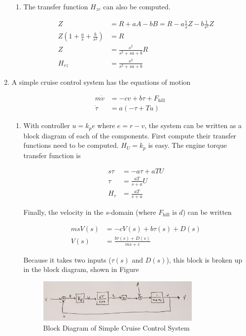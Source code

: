 \documentclass[11pt]{article}
\theoremstyle{definition}
\begin{document}
\begin{enumerate}
\begin{enumerate}
        \item %
        The transfer function $H_{zr}$ can also be computed.

        \begin{align*}
            Z &= R + aA - bB = R - a \frac{1}{s}Z - b \frac{1}{s^2}Z \\
            Z\left( 1 + \frac{a}{s} + \frac{b}{s^2} \right) &= R \\
            Z &= \frac{s^2}{s^2 + sa + b} R \\
            H_{rz} &= \frac{s^2}{s^2 + sa + b}
        \end{align*}
    \end{enumerate}

     \item %
     A simple cruise control system has the equations of motion

     \begin{align*}
        m \dot{v} &= -cv + b \tau + F_{\text{hill}} \\
        \dot{\tau} &= a( -\tau + Tu)
     \end{align*}

    \begin{enumerate}
        \item %
        With controller $u = k_p e$ where $e = r - v$, the system can be written as a block diagram of each of the components.  First compute their transfer functions need to be computed.  $H_U = k_p$ is easy.  The engine torque transfer function is 

        \begin{align*}
            s\tau &= -a\tau + aTU \\
            \tau &= \frac{aT}{s + a}U \\
            H_\tau &= \frac{aT}{s + a}
        \end{align*}

        Finally, the velocity in the $s$-domain (where $F_\text{hill} \text{ is } d$) can be written 

        \begin{align*}
            msV(s) &= -cV(s) + b\tau(s) + D(s) \\
            V(s) &= \frac{b\tau(s) + D(s)}{ms + c}
        \end{align*}

        Because it takes two inputs ($\tau(s)$ and $D(s)$), this block is broken up in the block diagram, shown in Figure 

        \begin{figure}
            \centering
            \includegraphics[width = 0.8\textwidth]{blocka.jpg}
            \caption{Block Diagram of Simple Cruise Control System}
            \label{fig:p_control}
        \end{figure}


\end{enumerate}
\end{enumerate}
\end{document}
